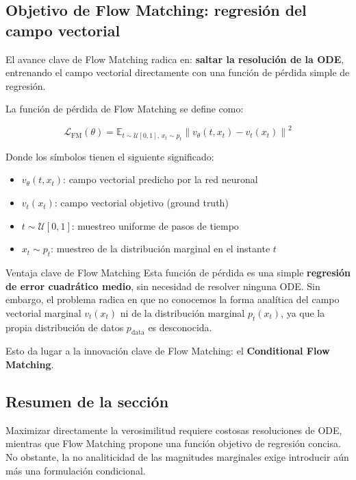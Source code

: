 \documentclass[a4paper]{article}
\begin{document}
\subsection{Objetivo de Flow Matching: regresión del campo vectorial}

El avance clave de Flow Matching radica en: \textbf{saltar la resolución de la ODE}, entrenando el campo vectorial directamente con una función de pérdida simple de regresión.

La función de pérdida de Flow Matching se define como:

$$\mathcal{L}_{\text{FM}}(\theta) = \mathbb{E}_{t \sim \mathcal{U}[0,1], \, x_t \sim p_t} \left\| v_\theta(t, x_t) - v_t(x_t) \right\|^2$$

Donde los símbolos tienen el siguiente significado:
\begin{itemize}
    \item $v_\theta(t, x_t)$: campo vectorial predicho por la red neuronal
    \item $v_t(x_t)$: campo vectorial objetivo (ground truth)
    \item $t \sim \mathcal{U}[0,1]$: muestreo uniforme de pasos de tiempo
    \item $x_t \sim p_t$: muestreo de la distribución marginal en el instante $t$
\end{itemize}

\begin{importantbox}{Ventaja clave de Flow Matching}
Esta función de pérdida es una simple \textbf{regresión de error cuadrático medio}, sin necesidad de resolver ninguna ODE. Sin embargo, el problema radica en que no conocemos la forma analítica del campo vectorial marginal $v_t(x_t)$ ni de la distribución marginal $p_t(x_t)$, ya que la propia distribución de datos $p_{\text{data}}$ es desconocida.

Esto da lugar a la innovación clave de Flow Matching: el \textbf{Conditional Flow Matching}.
\end{importantbox}

\subsection{Resumen de la sección}

Maximizar directamente la verosimilitud requiere costosas resoluciones de ODE, mientras que Flow Matching propone una función objetivo de regresión concisa. No obstante, la no analiticidad de las magnitudes marginales exige introducir aún más una formulación condicional.
\end{document}
